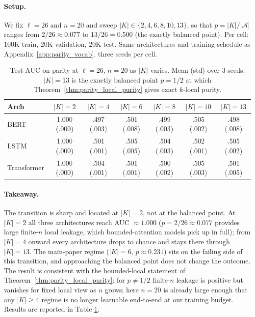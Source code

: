 \documentclass{article}
\theoremstyle{plain}
\theoremstyle{definition}
\theoremstyle{remark}
\begin{document}
\paragraph{Setup.} We fix $\ell = 26$ and $n = 20$ and sweep $|K| \in \{2, 4, 6, 8, 10, 13\}$, so that $p = |K|/|\mathcal{A}|$ ranges from $2/26 \approx 0.077$ to $13/26 = 0.500$ (the exactly balanced point). Per cell: $100\text{K}$ train, $20\text{K}$ validation, $20\text{K}$ test. Same architectures and training schedule as Appendix~\ref{app:parity_vocab}, three seeds per cell.

\begin{table}[h]
\centering
\caption{Test AUC on parity at $\ell = 26$, $n = 20$ as $|K|$ varies. Mean (std) over 3 seeds. $|K| = 13$ is the exactly balanced point $p = 1/2$ at which Theorem~\ref{thm:parity_local_purity} gives exact $k$-local purity.}
\label{tab:parity_subset}
\begin{tabular}{@{}lcccccc@{}}
\toprule
Arch & $|K|{=}2$ & $|K|{=}4$ & $|K|{=}6$ & $|K|{=}8$ & $|K|{=}10$ & $|K|{=}13$ \\
\midrule
BERT        & 1.000 (.000) & .497 (.003) & .501 (.008) & .499 (.003) & .505 (.002) & .498 (.008) \\
LSTM        & 1.000 (.000) & .501 (.001) & .505 (.005) & .504 (.003) & .502 (.001) & .505 (.002) \\
Transformer & 1.000 (.000) & .504 (.001) & .501 (.001) & .500 (.002) & .505 (.003) & .501 (.005) \\
\bottomrule
\end{tabular}
\end{table}

\paragraph{Takeaway.} The transition is sharp and located at $|K| = 2$, not at the balanced point. At $|K| = 2$ all three architectures reach AUC $\approx 1.000$ ($p = 2/26 \approx 0.077$ provides large finite-$n$ local leakage, which bounded-attention models pick up in full); from $|K| = 4$ onward every architecture drops to chance and stays there through $|K| = 13$. The main-paper regime ($|K| = 6$, $p \approx 0.231$) sits on the failing side of this transition, and approaching the balanced point does not change the outcome. The result is consistent with the bounded-local statement of Theorem~\ref{thm:parity_local_purity}: for $p \neq 1/2$ finite-$n$ leakage is positive but vanishes for fixed local view as $n$ grows; here $n = 20$ is already large enough that any $|K| \ge 4$ regime is no longer learnable end-to-end at our training budget. Results are reported in Table \ref{tab:parity_subset}.
\end{document}

